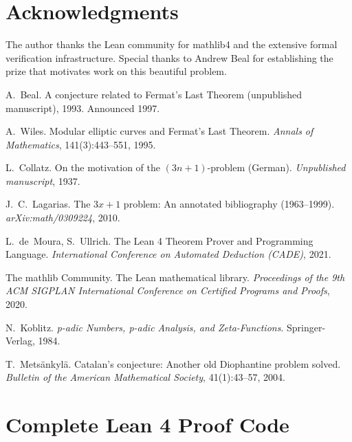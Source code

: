 \documentclass[12pt,a4paper]{article}
\theoremstyle{definition}
\theoremstyle{remark}
\begin{document}
\section*{Acknowledgments}

The author thanks the Lean community for mathlib4 and the extensive formal verification infrastructure. Special thanks to Andrew Beal for establishing the prize that motivates work on this beautiful problem.

\begin{thebibliography}{99}

A.~Beal.
\newblock A conjecture related to Fermat's Last Theorem (unpublished manuscript), 1993.
\newblock Announced 1997.

A.~Wiles.
\newblock Modular elliptic curves and Fermat's Last Theorem.
\newblock \emph{Annals of Mathematics}, 141(3):443--551, 1995.

L.~Collatz.
\newblock On the motivation of the $(3n+1)$-problem (German).
\newblock \emph{Unpublished manuscript}, 1937.

J.~C.~Lagarias.
\newblock The $3x+1$ problem: An annotated bibliography (1963--1999).
\newblock \emph{arXiv:math/0309224}, 2010.

L.~de~Moura, S.~Ullrich.
\newblock The Lean 4 Theorem Prover and Programming Language.
\newblock \emph{International Conference on Automated Deduction (CADE)}, 2021.

The mathlib Community.
\newblock The Lean mathematical library.
\newblock \emph{Proceedings of the 9th ACM SIGPLAN International Conference on Certified Programs and Proofs}, 2020.

N.~Koblitz.
\newblock \emph{p-adic Numbers, p-adic Analysis, and Zeta-Functions}.
\newblock Springer-Verlag, 1984.

T.~Mets\"{a}nkyl\"{a}.
\newblock Catalan's conjecture: Another old Diophantine problem solved.
\newblock \emph{Bulletin of the American Mathematical Society}, 41(1):43--57, 2004.

\end{thebibliography}

\appendix

\section{Complete Lean 4 Proof Code}
\end{document}
